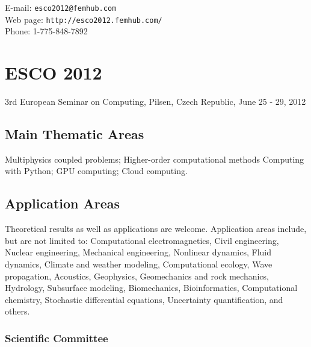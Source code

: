 \documentclass[article,A4,11pt]{llncs}%
\begin{document}
\noindent
E-mail: {\tt esco2012@femhub.com}\\
Web page: {\tt http://esco2012.femhub.com/}\\
Phone: 1-775-848-7892

\chapter*{\huge ESCO 2012}
\vspace{-5mm}
\normalsize   
\begin{center}
3rd European Seminar on Computing, 
Pilsen, Czech Republic,
June 25 - 29, 2012
\end{center}
\vspace{-3mm}

\section*{Main Thematic Areas}%

Multiphysics coupled problems; Higher-order computational methods
Computing with Python; GPU computing; Cloud computing.

\section*{Application Areas}%

Theoretical results as well as applications are welcome. Application areas include, but are not limited to: Computational electromagnetics, Civil engineering, Nuclear engineering, Mechanical engineering, Nonlinear dynamics, Fluid dynamics, Climate and weather modeling, Computational ecology, Wave propagation, Acoustics, Geophysics, Geomechanics and rock mechanics, Hydrology, Subsurface modeling, Biomechanics, Bioinformatics, Computational chemistry, Stochastic differential equations, Uncertainty quantification, and others.

\subsection*{Scientific Committee}%

\end{document}
